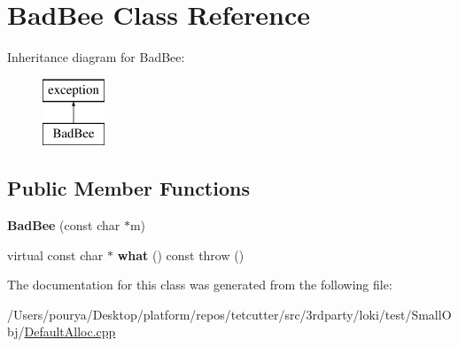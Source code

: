 \hypertarget{classBadBee}{}\section{Bad\+Bee Class Reference}
\label{classBadBee}
Inheritance diagram for Bad\+Bee\+:\begin{figure}[H]
\begin{center}
\leavevmode
\includegraphics[height=2.000000cm]{classBadBee}
\end{center}
\end{figure}
\subsection*{Public Member Functions}
\begin{DoxyCompactItemize}
\item 
\hypertarget{classBadBee_ab481c99828441a0629fbea372452353d}{}{\bfseries Bad\+Bee} (const char $\ast$m)\label{classBadBee_ab481c99828441a0629fbea372452353d}

\item 
\hypertarget{classBadBee_a13dea3f36d8a51787c2edee647e6dc5c}{}virtual const char $\ast$ {\bfseries what} () const   throw ()\label{classBadBee_a13dea3f36d8a51787c2edee647e6dc5c}

\end{DoxyCompactItemize}


The documentation for this class was generated from the following file\+:\begin{DoxyCompactItemize}
\item 
/\+Users/pourya/\+Desktop/platform/repos/tetcutter/src/3rdparty/loki/test/\+Small\+Obj/\hyperlink{DefaultAlloc_8cpp}{Default\+Alloc.\+cpp}\end{DoxyCompactItemize}
